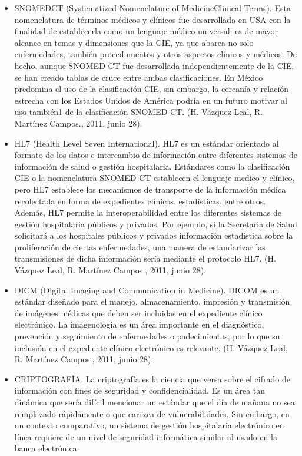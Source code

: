 \begin{itemize}
  \item SNOMEDCT (Systematized Nomenclature of MedicineClinical Terms). Esta nomenclatura de términos médicos y clínicos fue desarrollada en USA con la finalidad de establecerla como un lenguaje médico universal; es de mayor alcance en temas y dimensiones que la CIE, ya que abarca no solo enfermedades, también procedimientos y otros aspectos clínicos y médicos. De hecho, aunque SNOMED CT fue desarrollada independientemente de la CIE, se han creado tablas de cruce entre ambas clasificaciones. En México predomina el uso de la clasificación CIE, sin embargo, la cercanía y relación estrecha con los Estados Unidos de América podría en un futuro motivar al uso también1 de la clasificación SNOMED CT. (H. Vázquez Leal, R. Martínez Campos., 2011, junio 28).
  \item HL7 (Health Level Seven International). HL7 es un estándar orientado al formato de los datos e intercambio de información entre diferentes sistemas de información de salud o gestión hospitalaria. Estándares como la clasificación CIE o la nomenclatura SNOMED CT establecen el lenguaje medico y clínico, pero HL7 establece los mecanismos de transporte de la información médica recolectada en forma de expedientes clínicos, estadísticas, entre otros. Además, HL7 permite la interoperabilidad entre los diferentes sistemas de gestión hospitalaria públicos y privados. Por ejemplo, si la Secretaria de Salud solicitará a los hospitales públicos y privados información estadística sobre la proliferación de ciertas enfermedades, una manera de estandarizar las transmisiones de dicha información sería mediante el protocolo HL7. (H. Vázquez Leal, R. Martínez Campos., 2011, junio 28).
  \item DICM (Digital Imaging and Communication in Medicine). DICOM es un estándar diseñado para el manejo, almacenamiento, impresión y transmisión de imágenes médicas que deben ser incluidas en el expediente clínico electrónico. La imagenología es un área importante en el diagnóstico, prevención y seguimiento de enfermedades o padecimientos, por lo que su inclusión en el expediente clínico electrónico es relevante. (H. Vázquez Leal, R. Martínez Campos., 2011, junio 28).
  \item CRIPTOGRAFÍA. La criptografía es la ciencia que versa sobre el cifrado de información con fines de seguridad y confidencialidad. Es un área tan dinámica que sería difícil mencionar un estándar que el día de mañana no sea remplazado rápidamente o que carezca de vulnerabilidades. Sin embargo, en un contexto comparativo, un sistema de gestión hospitalaria electrónico en línea requiere de un nivel de seguridad informática similar al usado en la banca electrónica.
\end{itemize}

